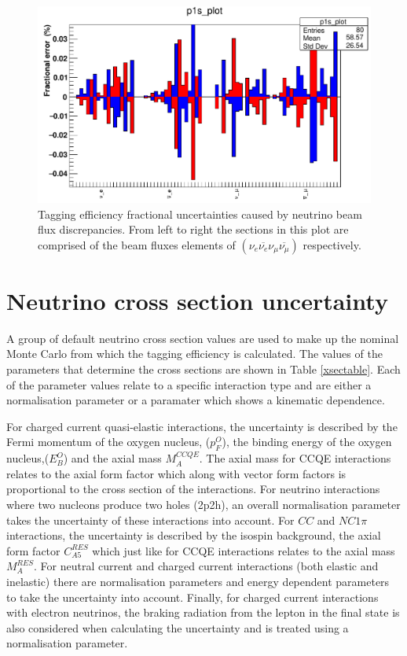 \begin{figure}
\includegraphics[scale=0.4]{Figures/flux_uncertainty.png}
\caption{Tagging efficiency fractional uncertainties caused by neutrino beam flux discrepancies. From left to right the sections in this plot are comprised of the beam fluxes elements of $\left(\nu_{e} \overline{\nu_{e}} \nu_{\mu} \overline{\nu_{\mu}}\right)$ respectively.}
\label{fig:fluxuncertainty}
\end{figure}

\section{Neutrino cross section uncertainty}

A group of default neutrino cross section values are used to make up the nominal Monte Carlo from which the tagging efficiency is calculated. The values of the parameters that determine the cross sections are shown in Table \ref{xsectable}. Each of the parameter values relate to a specific interaction type and are either a normalisation parameter or a paramater which shows a kinematic dependence. \newline

For charged current quasi-elastic interactions, the uncertainty is described by the Fermi momentum of the oxygen nucleus, ($p_{F}^{O}$), the binding energy of the oxygen nucleus,($E_{B}^{O}$) and the axial mass $M_{A}^{C C Q E}$. The axial mass for CCQE interactions relates to the axial form factor which along with vector form factors is proportional to the cross section of the interactions. For neutrino interactions where two nucleons produce two holes (2p2h), an overall normalisation parameter takes the uncertainty of these interactions into account. For $CC$ and $NC1\pi$ interactions, the uncertainty is described by the isospin background, the axial form factor $C_{A 5}^{R E S}$ which just like for CCQE interactions relates to the axial mass $M_{A}^{R E S}$. For neutral current and charged current interactions (both elastic and inelastic) there are normalisation parameters and energy dependent parameters to take the uncertainty into account. Finally, for charged current interactions with electron neutrinos, the braking radiation from the lepton in the final state is also considered when calculating the uncertainty and is treated using a normalisation parameter.
\newline

